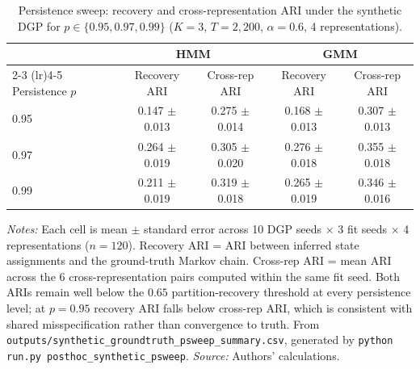 \documentclass[preprint,12pt,authoryear]{elsarticle}
\begin{document}
\begin{table}[!htbp]
\centering
\small
\setlength{\tabcolsep}{4pt}
\caption{Persistence sweep: recovery and cross-representation ARI under the synthetic DGP for $p \in \{0.95, 0.97, 0.99\}$ ($K=3$, $T=2{,}200$, $\alpha=0.6$, 4 representations).}
\label{tab:synth_psweep}
\begin{tabular}{lcccc}
\toprule
& \multicolumn{2}{c}{HMM} & \multicolumn{2}{c}{GMM} \\
\cmidrule(lr){2-3} \cmidrule(lr){4-5}
Persistence $p$ & Recovery ARI & Cross-rep ARI & Recovery ARI & Cross-rep ARI \\
\midrule
0.95 & 0.147 $\pm$ 0.013 & 0.275 $\pm$ 0.014 & 0.168 $\pm$ 0.013 & 0.307 $\pm$ 0.013 \\
0.97 & 0.264 $\pm$ 0.019 & 0.305 $\pm$ 0.020 & 0.276 $\pm$ 0.018 & 0.355 $\pm$ 0.018 \\
0.99 & 0.211 $\pm$ 0.019 & 0.319 $\pm$ 0.018 & 0.265 $\pm$ 0.019 & 0.346 $\pm$ 0.016 \\
\bottomrule
\end{tabular}
\par\medskip
\footnotesize
\parbox{\linewidth}{\textit{Notes:} Each cell is mean $\pm$ standard error across 10 DGP seeds $\times$ 3 fit seeds $\times$ 4 representations ($n=120$). Recovery ARI = ARI between inferred state assignments and the ground-truth Markov chain. Cross-rep ARI = mean ARI across the 6 cross-representation pairs computed within the same fit seed. Both ARIs remain well below the $0.65$ partition-recovery threshold at every persistence level; at $p=0.95$ recovery ARI falls below cross-rep ARI, which is consistent with shared misspecification rather than convergence to truth. From \texttt{outputs/synthetic\_groundtruth\_psweep\_summary.csv}, generated by \texttt{python run.py posthoc\_synthetic\_psweep}. \textit{Source:} Authors' calculations.}
\end{table}
\end{document}
